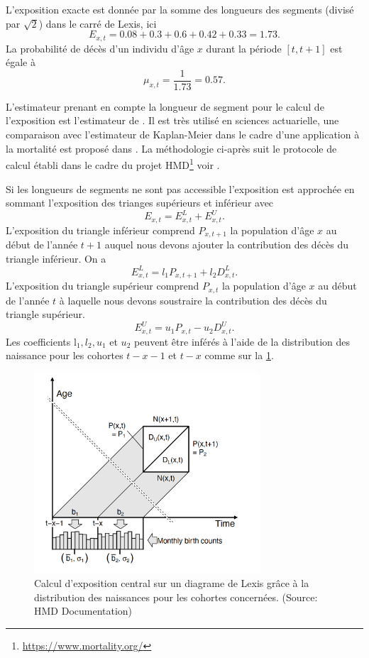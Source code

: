 L'exposition exacte est donnée par la somme des longueurs des segments (divisé par $\sqrt{2}$) dans le carré de Lexis, ici 
$$
E_{x,t} =  0.08 + 0.3 + 0.6 + 0.42 + 0.33 = 1.73.
$$
La probabilité de décès d'un individu d'âge $x$ durant la période $[t, t+1]$ est égale à 
$$
\mu_{x,t} = \frac{1}{1.73} = 0.57.
$$
\begin{remark}
L'estimateur prenant en compte la longueur de segment pour le calcul de l'exposition est l'estimateur de \citet{Hoem1971}. Il est très utilisé en sciences actuarielle, une comparaison avec l'estimateur de Kaplan-Meier dans le cadre d'une application à la mortalité est proposé dans \citet{Guibert2017}. La méthodologie ci-après suit le protocole de calcul établi dans le cadre du projet HMD\footnote{\url{https://www.mortality.org/}} voir \citet{Wilmoth2007}. 
\end{remark}
Si les longueurs de segments ne sont pas accessible l'exposition est approchée en sommant l'exposition des trianges supérieurs et inférieur avec 
$$
E_{x,t} = E_{x,t}^L + E_{x,t}^U.
$$
L'exposition du triangle inférieur comprend $P_{x,t+1}$ la population d'âge $x$ au début de l'année $t+1$ auquel nous devons ajouter la contribution des décès du triangle inférieur. On a 
$$
E_{x,t}^L = l_1P_{x,t+1}+l_2D^{L}_{x,t}.
$$
L'exposition du triangle supérieur comprend $P_{x,t}$ la population d'âge $x$ au début de l'année $t$ à laquelle nous devons soustraire la contribution des décès du triangle supérieur.  
$$
E_{x,t}^U = u_1P_{x,t}-u_2D^{U}_{x,t}.
$$
Les coefficients l$_1, l_2, u_1$ et $u_2$ peuvent être inférés à l'aide de la distribution des naissance pour les cohortes $t-x-1$ et $t-x$ comme sur la \cref{fig:Lexis_expo_computation}. 
\begin{figure}[h!] 
\centering
\includegraphics[width = 0.75\textwidth]{../figures/Lexis_expo_computation.png}
\caption{Calcul d'exposition central sur un diagrame de Lexis grâce à la distribution des naissances pour les cohortes concernées. (Source: HMD Documentation)}
\label{fig:Lexis_expo_computation}
\end{figure}
